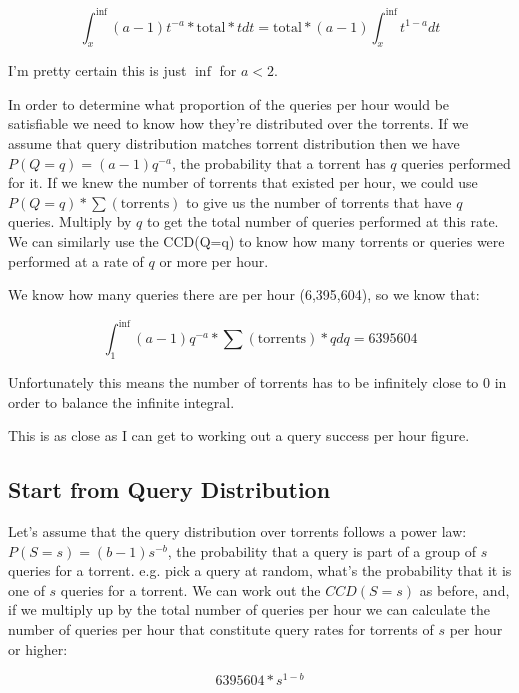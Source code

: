 \documentclass{article}
\begin{document}
        \begin{equation}
            \int_x^{\inf} (a-1)t^{-a}*\textrm{total}*tdt = \textrm{total}*(a-1)\int_x^{\inf} t^{1-a}dt
        \end{equation}

        I'm pretty certain this is just $\inf$ for $a<2$.

        In order to determine what proportion of the queries per hour would be satisfiable we need to know how they're distributed over the torrents. If we assume that query distribution matches torrent distribution then we have $P(Q=q)=(a-1)q^{-a}$, the probability that a torrent has $q$ queries performed for it. If we knew the number of torrents that existed per hour, we could use $P(Q=q)*\sum(\textrm{torrents})$ to give us the number of torrents that have $q$ queries. Multiply by $q$ to get the total number of queries performed at this rate. We can similarly use the CCD(Q=q) to know how many torrents or queries were performed at a rate of $q$ or more per hour.

        We know how many queries there are per hour (6,395,604), so we know that:

        \begin{equation}
            \int_1^{\inf} (a-1)q^{-a}*\sum(\textrm{torrents})*q dq = 6395604
        \end{equation}

        Unfortunately this means the number of torrents has to be infinitely close to 0 in order to balance the infinite integral.

        This is as close as I can get to working out a query success per hour figure.

    \subsection{Start from Query Distribution}

        Let's assume that the query distribution over torrents follows a power law: $P(S=s)=(b-1)s^{-b}$, the probability that a query is part of a group of $s$ queries for a torrent. e.g. pick a query at random, what's the probability that it is one of $s$ queries for a torrent. We can work out the $CCD(S=s)$ as before, and, if we multiply up by the total number of queries per hour we can calculate the number of queries per hour that constitute query rates for torrents of $s$ per hour or higher:

        \begin{equation}
            6395604*s^{1-b}
        \end{equation}
\end{document}
